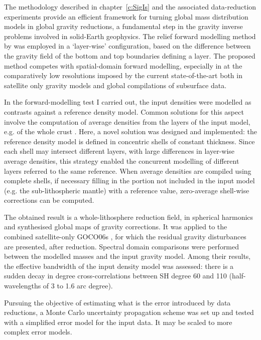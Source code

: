 
The methodology described in chapter~\ref{c:SigIs} and the associated data-reduction experiments provide an efficient framework for turning global mass distribution models in global gravity reductions, a fundamental step in the gravity inverse problems involved in solid-Earth geophysics.
The relief forward modelling method by \textcite{Wieczorek2007} was employed in a `layer-wise' configuration, based on the difference between the gravity field of the bottom and top boundaries defining a layer.
The proposed method competes with spatial-domain forward modelling, especially in at the comparatively low resolutions imposed by the current state-of-the-art both in satellite only gravity models and global compilations of subsurface data.

In the forward-modelling test I carried out, the input densities were modelled as contrasts against a reference density model.
Common solutions for this aspect involve the computation of average densities from the layers of the input model, e.g. of the whole crust \parencites{Tenzer2015}{Tenzer2019}.
Here, a novel solution was designed and implemented: the reference density model is defined in concentric shells of constant thickness.
Since each shell may intersect different layers, with large differences in layer-wise average densities, this strategy enabled the concurrent modelling of different layers referred to the same reference.
When average densities are compiled using complete shells, if necessary filling in the portion not included in the input model (e.g. the sub-lithospheric mantle) with a reference value, zero-average shell-wise corrections can be computed.

The obtained result is a whole-lithosphere reduction field, in spherical harmonics and synthesised global maps of gravity corrections.
It was applied to the combined satellite-only {GOCO06s} \parencite{Kvas_GOCO06s_dataset}, for which the residual gravity disturbances are presented, after reduction.
Spectral domain comparisons were performed between the modelled masses and the input gravity model.
Among their results, the effective bandwidth of the input density model was assessed: there is a sudden decay in degree cross-correlations between SH degree \num{60} and \num{110} (half-wavelengths of \num{3} to \num{1.6} arc degree).

Pursuing the objective of estimating what is the error introduced by data reductions, a Monte Carlo uncertainty propagation scheme was set up and tested with a simplified error model for the input data.
It may be scaled to more complex error models.

